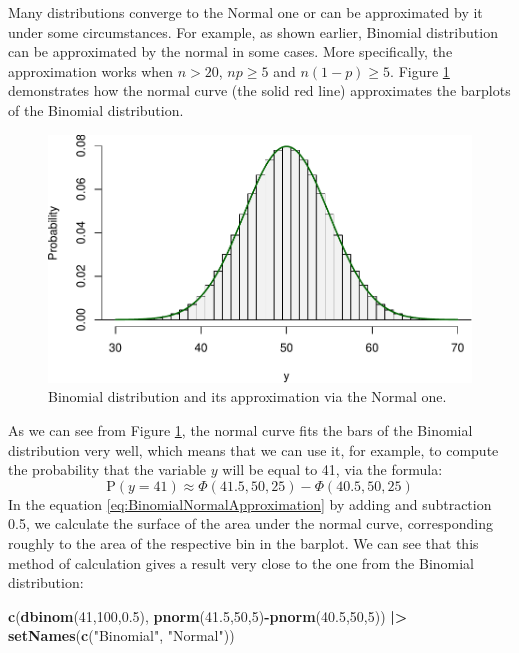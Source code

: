 \documentclass[
]{book}
\newenvironment{Shaded}{\begin{snugshade}}{\end{snugshade}}
\newcommand{\DecValTok}[1]{\textcolor[rgb]{0.00,0.00,0.81}{#1}}
\newcommand{\ErrorTok}[1]{\textcolor[rgb]{0.64,0.00,0.00}{\textbf{#1}}}
\newcommand{\FloatTok}[1]{\textcolor[rgb]{0.00,0.00,0.81}{#1}}
\newcommand{\KeywordTok}[1]{\textcolor[rgb]{0.13,0.29,0.53}{\textbf{#1}}}
\newcommand{\NormalTok}[1]{#1}
\newcommand{\OperatorTok}[1]{\textcolor[rgb]{0.81,0.36,0.00}{\textbf{#1}}}
\newcommand{\StringTok}[1]{\textcolor[rgb]{0.31,0.60,0.02}{#1}}
\theoremstyle{definition}
\theoremstyle{definition}
\theoremstyle{definition}
\theoremstyle{definition}
\theoremstyle{remark}
\begin{document}
Many distributions converge to the Normal one or can be approximated by it under some circumstances. For example, as shown earlier, Binomial distribution can be approximated by the normal in some cases. More specifically, the approximation works when \(n>20\), \(n p \geq 5\) and \(n(1-p) \geq 5\). Figure \ref{fig:binomialNormalApprox} demonstrates how the normal curve (the solid red line) approximates the barplots of the Binomial distribution.

\begin{figure}
\centering
\includegraphics{Svetunkov---Statistics-for-Business-Analytics_files/figure-latex/binomialNormalApprox-1.pdf}
\caption{\label{fig:binomialNormalApprox}Binomial distribution and its approximation via the Normal one.}
\end{figure}

As we can see from Figure \ref{fig:binomialNormalApprox}, the normal curve fits the bars of the Binomial distribution very well, which means that we can use it, for example, to compute the probability that the variable \(y\) will be equal to 41, via the formula:
\begin{equation}
    \mathrm{P}(y=41) \approx \Phi(41.5, 50, 25) - \Phi(40.5, 50, 25)
    \label{eq:BinomialNormalApproximation}
\end{equation}
In the equation \eqref{eq:BinomialNormalApproximation} by adding and subtraction 0.5, we calculate the surface of the area under the normal curve, corresponding roughly to the area of the respective bin in the barplot. We can see that this method of calculation gives a result very close to the one from the Binomial distribution:

\begin{Shaded}
\begin{Highlighting}[]
\KeywordTok{c}\NormalTok{(}\KeywordTok{dbinom}\NormalTok{(}\DecValTok{41}\NormalTok{,}\DecValTok{100}\NormalTok{,}\FloatTok{0.5}\NormalTok{),}
  \KeywordTok{pnorm}\NormalTok{(}\FloatTok{41.5}\NormalTok{,}\DecValTok{50}\NormalTok{,}\DecValTok{5}\NormalTok{)}\OperatorTok{{-}}\KeywordTok{pnorm}\NormalTok{(}\FloatTok{40.5}\NormalTok{,}\DecValTok{50}\NormalTok{,}\DecValTok{5}\NormalTok{)) }\OperatorTok{|}\ErrorTok{\textgreater{}}
\StringTok{    }\KeywordTok{setNames}\NormalTok{(}\KeywordTok{c}\NormalTok{(}\StringTok{"Binomial"}\NormalTok{, }\StringTok{"Normal"}\NormalTok{))}
\end{Highlighting}
\end{Shaded}
\end{document}
